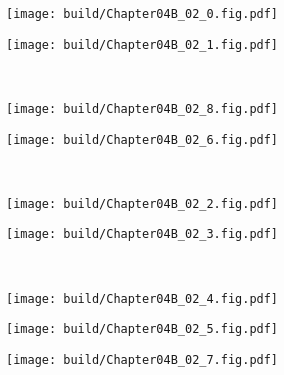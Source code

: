 \begin{Figure}[电流源负载的差分放大器的差模特性]
    \begin{FigureSub}
        \texttt{[image: build/Chapter04B\_02\_0.fig.pdf]}
    \end{FigureSub}
    \begin{FigureSub}
        \texttt{[image: build/Chapter04B\_02\_1.fig.pdf]}
    \end{FigureSub}\\ \vspace{0.75cm}
    \begin{FigureSub}
        \texttt{[image: build/Chapter04B\_02\_8.fig.pdf]}
    \end{FigureSub}
    \begin{FigureSub}
        \texttt{[image: build/Chapter04B\_02\_6.fig.pdf]}
    \end{FigureSub}\\ \vspace{0.75cm}
    \begin{FigureSub}
        \texttt{[image: build/Chapter04B\_02\_2.fig.pdf]}
    \end{FigureSub}
    \begin{FigureSub}
        \texttt{[image: build/Chapter04B\_02\_3.fig.pdf]}
    \end{FigureSub}\\ \vspace{0.75cm}
    \begin{FigureSub}
        \texttt{[image: build/Chapter04B\_02\_4.fig.pdf]}
    \end{FigureSub}
    \begin{FigureSub}
        \texttt{[image: build/Chapter04B\_02\_5.fig.pdf]}
    \end{FigureSub}
\end{Figure}

\begin{Figure}[电流源负载的差分放大器的差模输出电压]
    \texttt{[image: build/Chapter04B\_02\_7.fig.pdf]}
\end{Figure}

